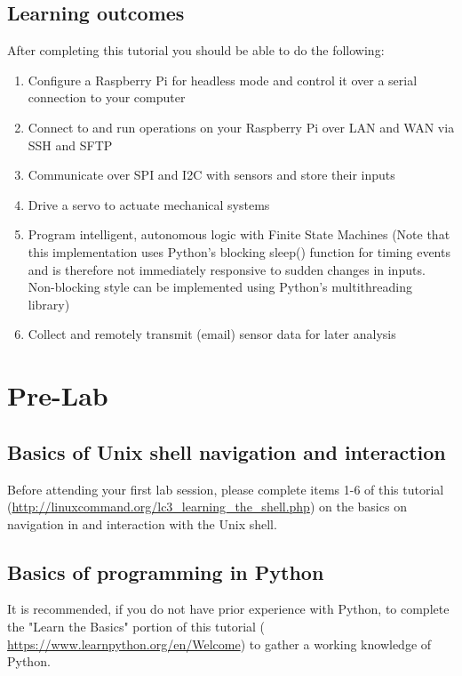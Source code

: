 \documentclass{article}
\begin{document}
  \subsection{Learning outcomes}
  After completing this tutorial you should be able to do the following:
  \begin{enumerate}
      \item Configure a Raspberry Pi for headless mode and control it over a serial connection to your computer
      \item Connect to and run operations on your Raspberry Pi over LAN and WAN via SSH and SFTP
      \item Communicate over SPI and I2C with sensors and store their inputs
      \item Drive a servo to actuate mechanical systems
      \item Program intelligent, autonomous logic with Finite State Machines (Note that this implementation uses Python's blocking sleep() function for timing events and is therefore not immediately responsive to sudden changes in inputs. Non-blocking style can be implemented using Python's multithreading library)
      \item Collect and remotely transmit (email) sensor data for later analysis
  \end{enumerate}

\section{Pre-Lab}
\subsection{Basics of Unix shell navigation and interaction}
Before attending your first lab session, please complete items 1-6 of this tutorial \newline (\href{http://linuxcommand.org/lc3\_learning\_the\_shell.php}{http://linuxcommand.org/lc3\_learning\_the\_shell.php}) on the basics on navigation in and interaction with the Unix shell.

\subsection{Basics of programming in Python}
It is recommended, if you do not have prior experience with Python, to complete the "Learn the Basics" portion of this tutorial (
\href{https://www.learnpython.org/en/Welcome}{https://www.learnpython.org/en/Welcome}) to gather a working knowledge of Python.
\end{document}
